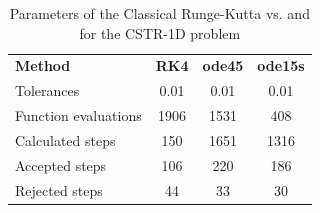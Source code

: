 \begin{table}[H]
    \centering
    \begin{tabular}{@{}l|c|c|c@{}}
    \toprule
    \textbf{Method}      & \textbf{RK4} & \textbf{ode45} & \textbf{ode15s} \\
    Tolerances           & 0.01         & 0.01           & 0.01            \\ \midrule
    Function evaluations & 1906         & 1531           & 408             \\
    Calculated steps     & 150          & 1651           & 1316            \\
    Accepted steps       & 106          & 220            & 186             \\
    Rejected steps       & 44           & 33             & 30              \\ \bottomrule
    \end{tabular}
    \caption{Parameters of the Classical Runge-Kutta vs.  and  for the CSTR-1D problem}
    \label{6_6_1D_table}
\end{table}


